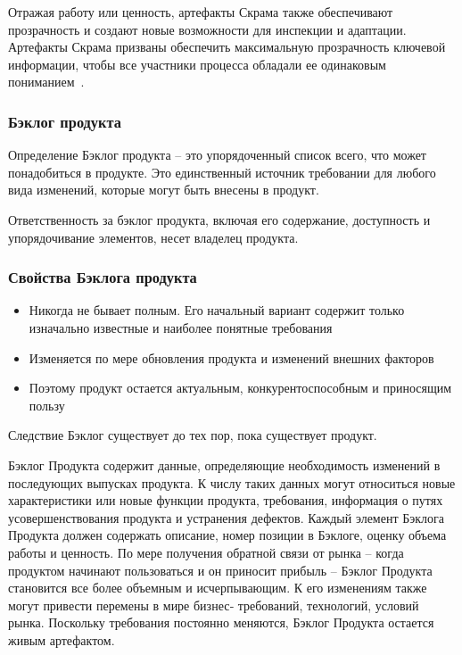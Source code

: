 \documentclass{../industrial-development}
\begin{document}
\lecturenotes
Отражая работу или ценность, артефакты Скрама также обеспечивают прозрачность и
создают новые возможности для инспекции и адаптации. Артефакты Скрама призваны
обеспечить максимальную прозрачность ключевой информации, чтобы все участники
процесса обладали ее одинаковым пониманием~\cite{Scrum}.

\begin{frame} \frametitle {Бэклог продукта} 
\begin {block} {Определение}
\alert{Бэклог продукта} – это упорядоченный список всего, что может понадобиться в продукте.
Это единственный источник требовании для любого вида изменений, которые могут быть
внесены в продукт. 
\end{block} 
Ответственность за бэклог продукта, включая его содержание,
доступность и упорядочивание элементов, несет \alert{владелец продукта}.
\end {frame}
 


\begin{frame} \frametitle {Свойства Бэклога продукта} 
\begin{itemize}
\item Никогда не бывает \alert{полным}. Его начальный вариант содержит только
изначально известные и наиболее понятные требования

\item Изменяется по мере обновления продукта и
изменений внешних факторов 

\item Поэтому продукт остается \alert{актуальным,
конкурентоспособным и приносящим пользу}
\end{itemize}
\begin{block}{Следствие} Бэклог существует до тех пор, пока существует продукт.
\end{block} 
\end {frame} 

\lecturenotes
Бэклог Продукта содержит данные, определяющие необходимость изменений в
последующих выпусках продукта. К числу таких данных могут относиться новые
характеристики или новые функции продукта, требования, информация о путях
усовершенствования продукта и устранения дефектов. Каждый элемент Бэклога Продукта
должен содержать описание, номер позиции в Бэклоге, оценку объема работы и ценность.
По мере получения обратной связи от рынка – когда продуктом начинают пользоваться и
он приносит прибыль – Бэклог Продукта становится все более объемным и
исчерпывающим. К его изменениям также могут привести перемены в мире бизнес‐
требований, технологий, условий рынка. Поскольку требования постоянно меняются,
Бэклог Продукта остается живым артефактом.
\end{document}
